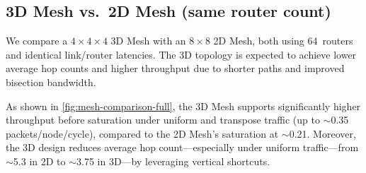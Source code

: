 \documentclass[11pt]{article}
\newcommand{\NumRoutersA}{64}         %
\begin{document}
\subsection{3D Mesh vs.\ 2D Mesh (same router count)}
\label{sec:mesh-baseline}

We compare a $4{\times}4{\times}4$ 3D Mesh with an $8{\times}8$ 2D Mesh, both using \NumRoutersA\ routers and identical link/router latencies. The 3D topology is expected to achieve lower average hop counts and higher throughput due to shorter paths and improved bisection bandwidth.

As shown in \cref{fig:mesh-comparison-full}, the 3D Mesh supports significantly higher throughput before saturation under uniform and transpose traffic (up to $\sim$0.35 packets/node/cycle), compared to the 2D Mesh's saturation at $\sim$0.21. Moreover, the 3D design reduces average hop count—especially under uniform traffic—from $\sim$5.3 in 2D to $\sim$3.75 in 3D—by leveraging vertical shortcuts.
\end{document}
